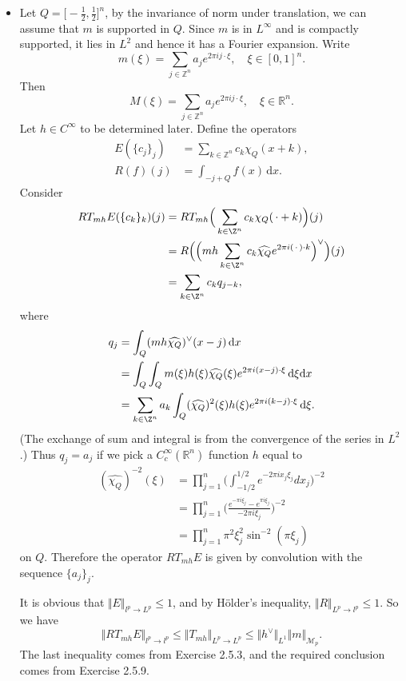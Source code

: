 \begin{itemize}
\item[2.5.10]
Let $Q=\big[\!-\!\frac12,\frac12\big]^n$, 
by the invariance of norm under translation, 
we can assume that $m$ is supported in $Q$. 
Since $m$ is in $L^\infty$ and is compactly supported, 
it lies in $L^2$ and hence it has a Fourier expansion. 
Write $$m(\xi )=\sum_{j\in \mathbb{Z}^n}a_je^{2\pi ij\cdot \xi},\quad \xi \in [0,1]^n.$$
Then $$M(\xi)=\sum_{j\in \mathbb{Z}^n}a_je^{2\pi ij\cdot \xi},\quad \xi \in \mathbb{R}^n.$$
Let $h\in C^\infty$ to be determined later. Define the operators
\begin{align*}E(\{c_j\}_j)&=\sum_{k\in \mathbb{Z}^n}c_k\chi _Q(x+k),\\
R(f)(j)&=\int_{-j+Q}f(x)\,\mathrm{d}x.\end{align*}
Consider 
\begin{align*}
    RT_{mh}E(\{c_k\}_k)(j)&=RT_{mh}\Big(\sum_{k\in\Z^n}c_k\chi _Q(\,\cdot+k)\Big)(j)\\
    &=R\Big(\Big(mh\sum_{k\in\Z^n}c_k\widehat{\chi _Q}e^{2\pi i (\,\cdot\,)\cdot k}\Big)^\vee\Big)(j)\\
    &=\sum_{k\in\Z^n}c_kq_{j-k},
\end{align*}
where 
\begin{align*}
    q_j&=\int _Q(mh\widehat{\chi _Q})^\vee(x-j)\,\mathrm{d}x\\
    &=\int_Q\int_Qm(\xi)h(\xi)\widehat{\chi _Q}(\xi)e^{2\pi i (x-j)\cdot \xi}\,\mathrm{d}\xi\mathrm{d}x\\
    &=\sum_{k\in\Z^n}a_k\int_{Q}(\widehat{\chi _Q})^2(\xi)h(\xi)e^{2\pi i(k-j)\cdot \xi}\,\mathrm{d}\xi.
\end{align*}
(The exchange of sum and integral is from the convergence of the series in $L^2$.) 
Thus $q_j=a_j$ if we pick a $C_c^\infty(\mathbb{R}^n)$ function $h$ 
equal to 
\begin{align*}
    (\widehat{\chi _Q})^{-2}(\xi)
    &=\prod_{j=1}^n\bigg(\int_{-1/2}^{1/2}e^{-2\pi ix_j\xi_j}dx_j\bigg)^{-2}\\
    &=\prod_{j=1}^n\bigg(\frac{e^{-\pi i\xi_j}-e^{\pi i\xi_j}}{-2\pi i\xi_j}\bigg)^{-2}\\
    &=\prod_{j=1}^n\pi^2\xi_j^2\sin^{-2}(\pi \xi_j)
\end{align*} on $Q$. 
Therefore the operator $RT_{mh}E$ is given by convolution with the sequence $\{a_j\}_j$.

It is obvious that $\Vert E\Vert _{l^p\to L^p}\leq 1$, and by Hölder's inequality, 
$\Vert R\Vert _{L^p\to l^p}\leq 1$. So we have
$$\Vert RT_{mh}E\Vert _{l^p\to l^p}\leq \Vert T_{mh}\Vert _{L^p\to L^p}
\leq \Vert h^\vee\Vert _{L^1}\Vert m\Vert _{\mathscr{M}_p}.$$
The last inequality comes from Exercise 2.5.3, 
and the required conclusion comes from Exercise 2.5.9.


\end{itemize}
